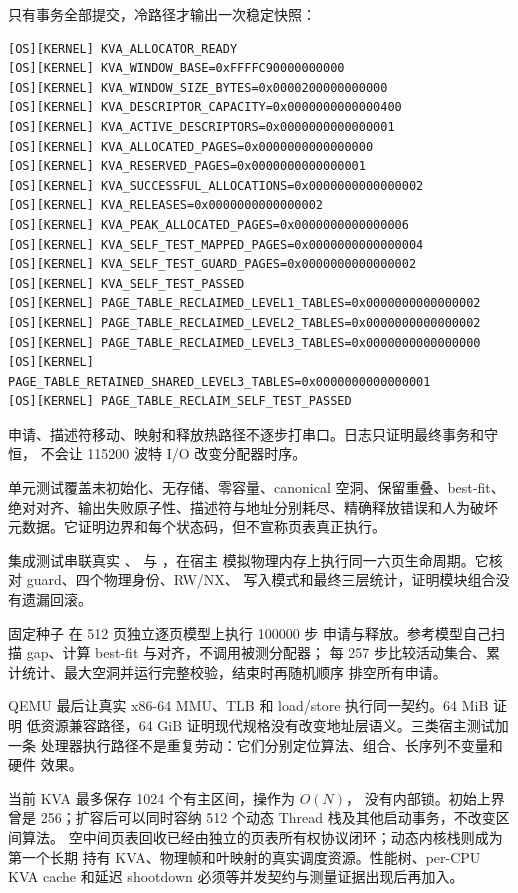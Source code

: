 只有事务全部提交，冷路径才输出一次稳定快照：

\begin{verbatim}
[OS][KERNEL] KVA_ALLOCATOR_READY
[OS][KERNEL] KVA_WINDOW_BASE=0xFFFFC90000000000
[OS][KERNEL] KVA_WINDOW_SIZE_BYTES=0x0000200000000000
[OS][KERNEL] KVA_DESCRIPTOR_CAPACITY=0x0000000000000400
[OS][KERNEL] KVA_ACTIVE_DESCRIPTORS=0x0000000000000001
[OS][KERNEL] KVA_ALLOCATED_PAGES=0x0000000000000000
[OS][KERNEL] KVA_RESERVED_PAGES=0x0000000000000001
[OS][KERNEL] KVA_SUCCESSFUL_ALLOCATIONS=0x0000000000000002
[OS][KERNEL] KVA_RELEASES=0x0000000000000002
[OS][KERNEL] KVA_PEAK_ALLOCATED_PAGES=0x0000000000000006
[OS][KERNEL] KVA_SELF_TEST_MAPPED_PAGES=0x0000000000000004
[OS][KERNEL] KVA_SELF_TEST_GUARD_PAGES=0x0000000000000002
[OS][KERNEL] KVA_SELF_TEST_PASSED
[OS][KERNEL] PAGE_TABLE_RECLAIMED_LEVEL1_TABLES=0x0000000000000002
[OS][KERNEL] PAGE_TABLE_RECLAIMED_LEVEL2_TABLES=0x0000000000000002
[OS][KERNEL] PAGE_TABLE_RECLAIMED_LEVEL3_TABLES=0x0000000000000000
[OS][KERNEL] PAGE_TABLE_RETAINED_SHARED_LEVEL3_TABLES=0x0000000000000001
[OS][KERNEL] PAGE_TABLE_RECLAIM_SELF_TEST_PASSED
\end{verbatim}

申请、描述符移动、映射和释放热路径不逐步打串口。日志只证明最终事务和守恒，
不会让 115200 波特 I/O 改变分配器时序。

单元测试覆盖未初始化、无存储、零容量、canonical 空洞、保留重叠、best-fit、
绝对对齐、输出失败原子性、描述符与地址分别耗尽、精确释放错误和人为破坏
元数据。它证明边界和每个状态码，但不宣称页表真正执行。

集成测试串联真实 、
 与 ，在宿主
模拟物理内存上执行同一六页生命周期。它核对 guard、四个物理身份、RW/NX、
写入模式和最终三层统计，证明模块组合没有遗漏回滚。

固定种子  在 512 页独立逐页模型上执行 100000 步
申请与释放。参考模型自己扫描 gap、计算 best-fit 与对齐，不调用被测分配器；
每 257 步比较活动集合、累计统计、最大空洞并运行完整校验，结束时再随机顺序
排空所有申请。

QEMU 最后让真实 x86-64 MMU、TLB 和 load/store 执行同一契约。64 MiB 证明
低资源兼容路径，64 GiB 证明现代规格没有改变地址层语义。三类宿主测试加一条
处理器执行路径不是重复劳动：它们分别定位算法、组合、长序列不变量和硬件
效果。

当前 KVA 最多保存 1024 个有主区间，操作为 \(O(N)\)，
没有内部锁。初始上界曾是 256；扩容后可以同时容纳 512 个动态
Thread 栈及其他启动事务，不改变区间算法。
空中间页表回收已经由独立的页表所有权协议闭环；动态内核栈则成为第一个长期
持有 KVA、物理帧和叶映射的真实调度资源。性能树、per-CPU KVA cache 和延迟
shootdown 必须等并发契约与测量证据出现后再加入。

